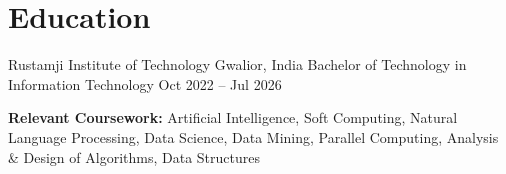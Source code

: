 

\section{Education}

\resumeSubHeadingListStart

\resumeSubheading
    {Rustamji Institute of Technology}
    {Gwalior, India}
    {Bachelor of Technology in Information Technology}
    {Oct 2022 -- Jul 2026}


    {\small \textbf{Relevant Coursework:} Artificial Intelligence, Soft Computing, Natural Language Processing, Data Science, Data Mining, Parallel Computing, Analysis \& Design of Algorithms, Data Structures}\par

\resumeSubHeadingListEnd
